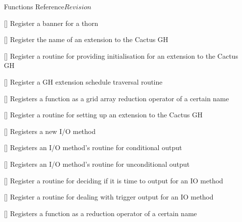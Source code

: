 \begin{cactuspart}{ Functions Reference}{}{$Revision$}
\begin{Lentry}
\item[\code{CCTK\_RegisterBanner}] [\pageref{CCTK-RegisterBanner}]
  Register a banner for a thorn

\item[\code{CCTK\_RegisterGHExtension}]
  [\pageref{CCTK-RegisterGHExtension}]
  Register the name of an extension to the Cactus GH

\item[\code{CCTK\_RegisterGHExtensionInitGH}]
  [\pageref{CCTK-RegisterGHExtensionInitGH}]
  Register a routine for providing initialisation for an extension to
  the Cactus GH

\item[\code{CCTK\_RegisterGHExtensionScheduleTraverseGH}]
  [\pageref{CCTK-RegisterGHExtensionScheduleTraverseGH}]
  Register a GH extension schedule traversal routine

\item[\code{CCTK\_RegisterGridArrayReductionOperator}] [\pageref{CCTK-RegisterGridArrayReductionOperator}]
  Registers a function as a grid array reduction operator of a certain name

\item[\code{CCTK\_RegisterGHExtensionSetupGH}]
  [\pageref{CCTK-RegisterGHExtensionSetupGH}]
  Register a routine for setting up an extension to the Cactus GH

\item[\code{CCTK\_RegisterIOMethod}]
  [\pageref{CCTK-RegisterIOMethod}]
  Registers a new I/O method

\item[\code{CCTK\_RegisterIOMethodOutputGH}]
  [\pageref{CCTK-RegisterIOMethodOutputGH}]
  Registers an I/O method's routine for conditional output

\item[\code{CCTK\_RegisterIOMethodOutputVarAs}]
  [\pageref{CCTK-RegisterIOMethodOutputVarAs}]
  Registers an I/O method's routine for unconditional output

\item[\code{CCTK\_RegisterIOMethodTimeToOutput}]
  [\pageref{CCTK-RegisterIOMethodTimeToOutput}]
  Register a routine for deciding if it is time to output for an IO method

\item[\code{CCTK\_RegisterIOMethodTriggerOutput}]
  [\pageref{CCTK-RegisterIOMethodTriggerOutput}]
  Register a routine for dealing with trigger output for an IO method

\item[\code{CCTK\_RegisterLocalArrayReductionOperator}] [\pageref{CCTK-RegisterLocalArrayReductionOperator}]
  Registers a function as a reduction operator of a certain name


\end{Lentry}
\end{cactuspart}
